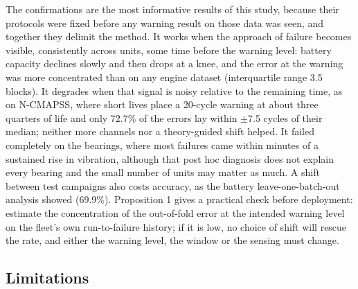 \documentclass[a4paper,fleqn,doubleblind]{cas-dc}
\begin{document}
The confirmations are the most informative results of this study, because their protocols were fixed before any warning result on those data was seen, and together they delimit the method. It works when the approach of failure becomes visible, consistently across units, some time before the warning level: battery capacity declines slowly and then drops at a knee, and the error at the warning was more concentrated than on any engine dataset (interquartile range 3.5 blocks). It degrades when that signal is noisy relative to the remaining time, as on N-CMAPSS, where short lives place a 20-cycle warning at about three quarters of life and only 72.7\% of the errors lay within $\pm$7.5 cycles of their median; neither more channels nor a theory-guided shift helped. It failed completely on the bearings, where most failures came within minutes of a sustained rise in vibration, although that post hoc diagnosis does not explain every bearing and the small number of units may matter as much. A shift between test campaigns also costs accuracy, as the battery leave-one-batch-out analysis showed (69.9\%). Proposition 1 gives a practical check before deployment: estimate the concentration of the out-of-fold error at the intended warning level on the fleet's own run-to-failure history; if it is low, no choice of shift will rescue the rate, and either the warning level, the window or the sensing must change.

\subsection{Limitations}
\end{document}
